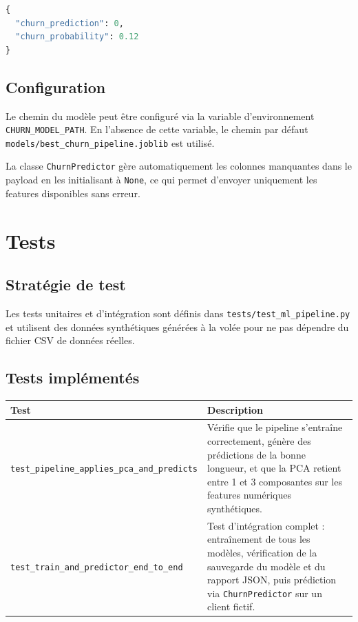 \documentclass[11pt,a4paper]{article}
\begin{document}
\begin{lstlisting}[language=Python, caption=Exemple de réponse JSON]
{
  "churn_prediction": 0,
  "churn_probability": 0.12
}
\end{lstlisting}

\subsection{Configuration}

Le chemin du modèle peut être configuré via la variable d'environnement \texttt{CHURN\_MODEL\_PATH}. En l'absence de cette variable, le chemin par défaut \texttt{models/best\_churn\_pipeline.joblib} est utilisé.

La classe \texttt{ChurnPredictor} gère automatiquement les colonnes manquantes dans le payload en les initialisant à \texttt{None}, ce qui permet d'envoyer uniquement les features disponibles sans erreur.

\section{Tests}

\subsection{Stratégie de test}

Les tests unitaires et d'intégration sont définis dans \texttt{tests/test\_ml\_pipeline.py} et utilisent des données synthétiques générées à la volée pour ne pas dépendre du fichier CSV de données réelles.

\subsection{Tests implémentés}

\begin{center}
\begin{tabular}{L{5cm} L{8cm}}
\toprule
\textbf{Test} & \textbf{Description} \\
\midrule
\texttt{test\_pipeline\_applies\_pca\_and\_predicts} & Vérifie que le pipeline s'entraîne correctement, génère des prédictions de la bonne longueur, et que la PCA retient entre 1 et 3 composantes sur les features numériques synthétiques. \\
\texttt{test\_train\_and\_predictor\_end\_to\_end} & Test d'intégration complet : entraînement de tous les modèles, vérification de la sauvegarde du modèle et du rapport JSON, puis prédiction via \texttt{ChurnPredictor} sur un client fictif. \\
\bottomrule
\end{tabular}
\end{center}
\end{document}
